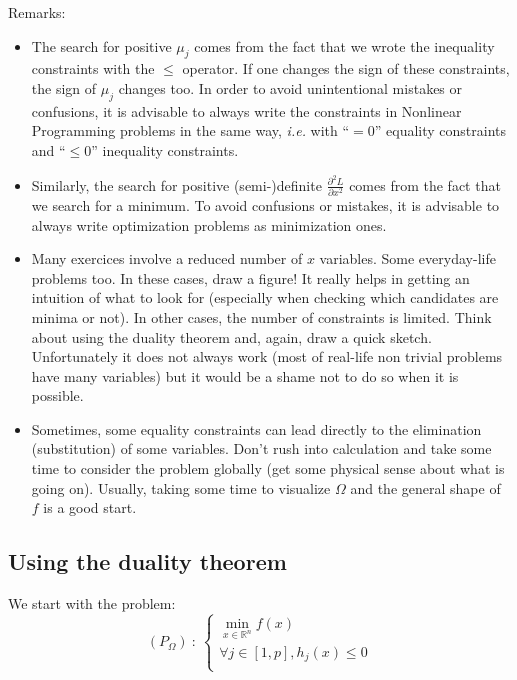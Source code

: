 \documentclass{article}
\begin{document}
\noindent Remarks:
\begin{itemize}
\item The search for positive $\mu_j$ comes from the fact that we wrote the inequality constraints with the $\leq$ operator. If one changes the sign of these constraints, the sign of $\mu_j$ changes too. In order to avoid unintentional mistakes or confusions, it is advisable to always write the constraints in Nonlinear Programming problems in the same way, \emph{i.e.} with ``$=0$'' equality constraints and ``$\leq0$'' inequality constraints.
\item Similarly, the search for positive (semi-)definite $\frac{\partial^2 L}{\partial x^2}$ comes from the fact that we search for a minimum. To avoid confusions or mistakes, it is advisable to always write optimization problems as minimization ones.
\item Many exercices involve a reduced number of $x$ variables. Some everyday-life problems too. In these cases, draw a figure! It really helps in getting an intuition of what to look for (especially when checking which candidates are minima or not). In other cases, the number of constraints is limited. Think about using the duality theorem and, again, draw a quick sketch. Unfortunately it does not always work (most of real-life non trivial problems have many variables) but it would be a shame not to do so when it is possible.
\item Sometimes, some equality constraints can lead directly to the elimination (substitution) of some variables. Don't rush into calculation and take some time to consider the problem globally (get some physical sense about what is going on). Usually, taking some time to visualize $\Omega$ and the general shape of $f$ is a good start.
\end{itemize}

\subsection{Using the duality theorem}

We start with the problem:
\begin{equation*}
\left( P_\Omega \right) \ : \ \left\{ \begin{array}{c}
\min\limits_{x\in\mathbb{R}^n} f(x)\\
\forall j\in [1,p], h_j(x) \leq 0\\
\end{array} \right.
\end{equation*}
\end{document}
